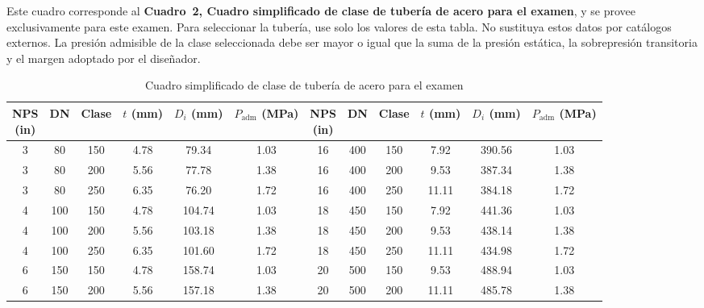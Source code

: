 \begin{warnbox}
Este cuadro corresponde al \textbf{Cuadro~2, Cuadro simplificado de clase de tubería de acero para el examen}, y se provee exclusivamente para este examen. Para seleccionar la tubería, use solo los valores de esta tabla. No sustituya estos datos por catálogos externos. La presión admisible de la clase seleccionada debe ser mayor o igual que la suma de la presión estática, la sobrepresión transitoria y el margen adoptado por el diseñador.
\end{warnbox}

\begin{table}[htbp]
\centering
\footnotesize
\caption{Cuadro simplificado de clase de tubería de acero para el examen}
\label{tab:clases-acero}
\begin{tabular}{cccccc|cccccc}
\toprule
\makecell{\textbf{NPS}\\\textbf{(in)}} &
\textbf{DN} &
\textbf{Clase} &
\makecell{\textbf{$t$}\\\textbf{(mm)}} &
\makecell{\textbf{$D_i$}\\\textbf{(mm)}} &
\makecell{\textbf{$P_{\mathrm{adm}}$}\\\textbf{(MPa)}} &
\makecell{\textbf{NPS}\\\textbf{(in)}} &
\textbf{DN} &
\textbf{Clase} &
\makecell{\textbf{$t$}\\\textbf{(mm)}} &
\makecell{\textbf{$D_i$}\\\textbf{(mm)}} &
\makecell{\textbf{$P_{\mathrm{adm}}$}\\\textbf{(MPa)}} \\
\midrule
3  & 80  & 150 & 4.78  & 79.34  & 1.03 & 16 & 400 & 150 & 7.92  & 390.56 & 1.03 \\
3  & 80  & 200 & 5.56  & 77.78  & 1.38 & 16 & 400 & 200 & 9.53  & 387.34 & 1.38 \\
3  & 80  & 250 & 6.35  & 76.20  & 1.72 & 16 & 400 & 250 & 11.11 & 384.18 & 1.72 \\
4  & 100 & 150 & 4.78  & 104.74 & 1.03 & 18 & 450 & 150 & 7.92  & 441.36 & 1.03 \\
4  & 100 & 200 & 5.56  & 103.18 & 1.38 & 18 & 450 & 200 & 9.53  & 438.14 & 1.38 \\
4  & 100 & 250 & 6.35  & 101.60 & 1.72 & 18 & 450 & 250 & 11.11 & 434.98 & 1.72 \\
6  & 150 & 150 & 4.78  & 158.74 & 1.03 & 20 & 500 & 150 & 9.53  & 488.94 & 1.03 \\
6  & 150 & 200 & 5.56  & 157.18 & 1.38 & 20 & 500 & 200 & 11.11 & 485.78 & 1.38 \\

\end{tabular}
\end{table}
